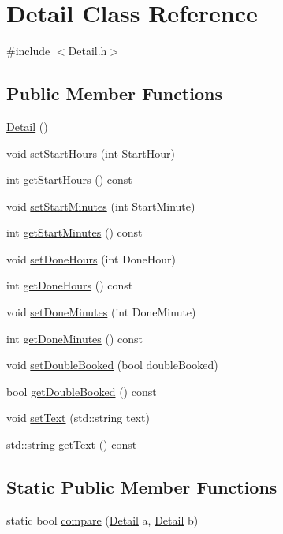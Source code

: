 \hypertarget{classDetail}{\section{Detail Class Reference}
\label{classDetail}
}


{\ttfamily \#include $<$Detail.\-h$>$}

\subsection*{Public Member Functions}
\begin{DoxyCompactItemize}
\item 
\hyperlink{classDetail_ade0deea5232733e7bdb658dadcc6b5fe}{Detail} ()
\item 
void \hyperlink{classDetail_ad62d325e64479e4e48f994bc0ef63874}{set\-Start\-Hours} (int Start\-Hour)
\item 
int \hyperlink{classDetail_a7e50f64f712a2775f4bfca3d5ca408d5}{get\-Start\-Hours} () const 
\item 
void \hyperlink{classDetail_a9272fb5c632df14c480a4e0065b5cc92}{set\-Start\-Minutes} (int Start\-Minute)
\item 
int \hyperlink{classDetail_ae7a56cb0c31323a94aea889f7b8790b8}{get\-Start\-Minutes} () const 
\item 
void \hyperlink{classDetail_af539d10fd24811f7d68bdf236a6feda0}{set\-Done\-Hours} (int Done\-Hour)
\item 
int \hyperlink{classDetail_a495a656ee4869f2dac3c27bc8105a606}{get\-Done\-Hours} () const 
\item 
void \hyperlink{classDetail_aad257615ab5ad0cb4447e677c547bd13}{set\-Done\-Minutes} (int Done\-Minute)
\item 
int \hyperlink{classDetail_a1ec3b7b3f3b2b8d587e2e55625288185}{get\-Done\-Minutes} () const 
\item 
void \hyperlink{classDetail_a3c4c2777819074375234980889aa4f1e}{set\-Double\-Booked} (bool double\-Booked)
\item 
bool \hyperlink{classDetail_a63624d1a3d099fa76cf776a00902d3e0}{get\-Double\-Booked} () const 
\item 
void \hyperlink{classDetail_afb3373c8d4361f64e39d29a70a7dcf98}{set\-Text} (std\-::string text)
\item 
std\-::string \hyperlink{classDetail_a8bb858933394ae9b854fbca7ce4db9cf}{get\-Text} () const 
\end{DoxyCompactItemize}
\subsection*{Static Public Member Functions}
\begin{DoxyCompactItemize}
\item 
static bool \hyperlink{classDetail_a23e6afc6f70c31bdcc064461b80ea44c}{compare} (\hyperlink{classDetail}{Detail} a, \hyperlink{classDetail}{Detail} b)
\end{DoxyCompactItemize}
